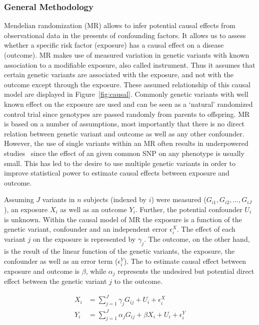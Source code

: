 \subsubsection{General Methodology}
\label{ssub:General_Methedology}

Mendelian randomization (MR) allows to infer potential causal effects from observational data in the presents of confounding factors. 
It allows us to assess whether a specific risk factor (exposure) has a causal effect on a disease (outcome).
MR makes use of measured variation in genetic variants with known association to a modifiable exposure, also called instrument.
Thus it assumes that certain genetic variants are associated with the exposure, and not with the outcome except through the exposure.
These assumed relationship of this causal model are displayed in Figure~\ref{fig:causal}.
Commonly genetic variants with well known effect on the exposure are used and can be seen as a `natural' randomized control trial since genotypes are passed randomly from parents to offspring.
MR is based on a number of assumptions, most importantly that there is no direct relation between genetic variant and outcome as well as any other confounder.
However, the use of single variants within an MR often results in underpowered studies~\cite{Bowden2015} since the effect of an given common SNP on any phenotype is usually small.
This has led to the desire to use multiple genetic variants in order to improve statistical power to estimate causal effects between exposure and outcome.

Assuming $J$ variants in $n$ subjects (indexed by $i$) were measured ($G_{i1}, G_{i2}, \ldots , G_{iJ}$),
an exposure $X_i$ as well as an outcome $Y_i$.
Further, the potential confounder $U_i$ is unknown. 
Within the causal model of MR the exposure is a function of the genetic variant, confounder and an independent error $\epsilon_i^X$. 
The effect of each variant $j$ on the exposure is represented by $\gamma_j$.
The outcome, on the other hand, is the result of the linear function of the genetic variants, the exposure, the confounder as well as an error term ($\epsilon_i^Y$).
The to estimate causal effect between exposure and outcome is $\beta$, while $\alpha_j$ represents the undesired but potential direct effect between the genetic variant $j$ to the outcome.

\begin{equation} \label{eq:rm_basic}
  \begin{split}
    X_i &= \sum^J_{j=1} \gamma_jG_{ij} + U_i + \epsilon_i^X \\
    Y_i &= \sum^J_{j=1} \alpha_jG_{ij} + \beta X_i + U_i + \epsilon_i^Y \\
  \end{split}
\end{equation}

